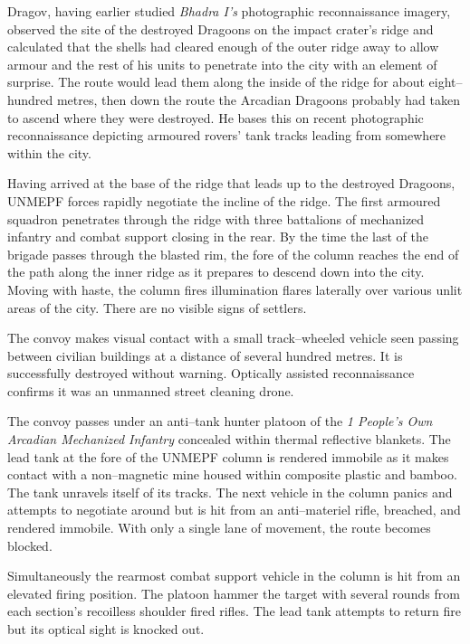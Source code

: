 Dragov, having earlier studied {\it Bhadra I's} photographic reconnaissance imagery, observed the site of the destroyed Dragoons on the impact crater's ridge and calculated that the shells had cleared enough of the outer ridge away to allow armour and the rest of his units to penetrate into the city with an element of surprise. The route would lead them along the inside of the ridge for about eight--hundred metres, then down the route the Arcadian Dragoons probably had taken to ascend where they were destroyed. He bases this on recent photographic reconnaissance depicting armoured rovers' tank tracks leading from somewhere within the city.

Having arrived at the base of the ridge that leads up to the destroyed Dragoons, UNMEPF forces rapidly negotiate the incline of the ridge. The first armoured squadron penetrates through the ridge with three battalions of mechanized infantry and combat support closing in the rear. By the time the last of the brigade passes through the blasted rim, the fore of the column reaches the end of the path along the inner ridge as it prepares to descend down into the city. Moving with haste, the column fires illumination flares laterally over various unlit areas of the city. There are no visible signs of settlers.

The convoy makes visual contact with a small track--wheeled vehicle seen passing between civilian buildings at a distance of several hundred metres. It is successfully destroyed without warning. Optically assisted reconnaissance confirms it was an unmanned street cleaning drone.

The convoy passes under an anti--tank hunter platoon of the {\it 1 People's Own Arcadian Mechanized Infantry} concealed within thermal reflective blankets. The lead tank at the fore of the UNMEPF column is rendered immobile as it makes contact with a non--magnetic mine housed within composite plastic and bamboo. The tank unravels itself of its tracks. The next vehicle in the column panics and attempts to negotiate around but is hit from an anti--materiel rifle, breached, and rendered immobile. With only a single lane of movement, the route becomes blocked.

Simultaneously the rearmost combat support vehicle in the column is hit from an elevated firing position. The platoon hammer the target with several rounds from each section's recoilless shoulder fired rifles. The lead tank attempts to return fire but its optical sight is knocked out.

